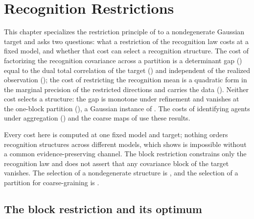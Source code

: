 \chapter{Recognition Restrictions}
\label{ch:restrictions}

This chapter specializes the restriction principle of
 to a nondegenerate Gaussian target and asks two
questions: what a restriction of the recognition law costs at a fixed model,
and whether that cost can select a recognition structure. The cost of
factorizing the recognition covariance across a partition is a determinant gap
() equal to the dual total correlation of
the target () and independent of
the realized observation (); the cost
of restricting the recognition mean is a quadratic form in the marginal
precision of the restricted directions and carries the data
(). Neither cost selects a structure: the gap is
monotone under refinement and vanishes at the one-block partition
(), a Gaussian instance of
. The costs of identifying agents
under aggregation () and the coarse maps of
 use these results.

Every cost here is computed at one fixed model and target; nothing orders
recognition structures across different models, which
 shows is impossible without a common
evidence-preserving channel. The block restriction constrains only the
recognition law and does not assert that any covariance block of the target
vanishes.  The selection of a nondegenerate structure is
, and the selection of a partition for
coarse-graining is .

\section{The block restriction and its optimum}
\label{sec:restrict-block}

